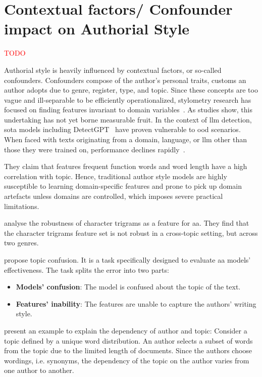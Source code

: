 \section{Contextual factors/ Confounder impact on Authorial Style}
\label{sec:contextual_factors}
\textcolor{red}{TODO}

Authorial style is heavily influenced by contextual factors, or so-called confounders.
Confounders compose of the author's personal traits, customs an author adopts due to genre, register, type, and topic.
Since these concepts are too vague and ill-separable to be efficiently operationalized, stylometry research has focused on finding features invariant to domain variables~\citep{bischoff_importance_2020}.
As studies show, this undertaking has not yet borne measurable fruit. 
In the context of \ac{llm} detection, \ac{sota} models including DetectGPT~\citep{mitchell_detectgpt_2023} have proven vulnerable to \ac{ood} scenarios.
When faced with texts originating from a domain, language, or \ac{llm} other than those they were trained on, performance declines rapidly~\citep{Wu_ODD_challenges_2025}.




They claim that features frequent function words and word length have a high correlation with topic. 
Hence, traditional author style models are highly susceptible to learning domain-specific features and 
prone to pick up domain artefacts unless domains are controlled, 
which imposes severe practical limitations.

\citet{bischoff_importance_2020} analyse the robustness of character trigrams as a feature for \ac{aa}.
They find that the character trigrams feature set is not robust in a cross-topic setting, but across two genres.



\citet{altakrori_topic_2021} propose topic confusion.
It is a task specifically designed to evaluate \ac{aa} models' effectiveness.
The task splits the error into two parts:
\begin{itemize}
    \item \textbf{Models' confusion}: The model is confused about the topic of the text.
    \item \textbf{Features' inability}: The features are unable to capture the authors' writing style.
\end{itemize}

\citet{altakrori_topic_2021} present an example to explain the dependency of author and topic:
Consider a topic defined by a unique word distribution.
An author selects a subset of words from the topic due to the limited length of documents.
Since the authors choose wordings, i.e. synonyms, the dependency of the topic on the author varies from one author to another.

